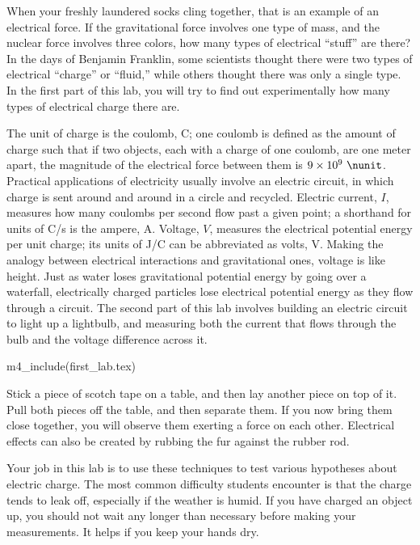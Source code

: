 \vfill

When your freshly laundered socks cling together, that is an
example of an electrical force. If the gravitational force
involves one type of mass, and the nuclear force involves
three colors, how many types of electrical ``stuff'' are
there? In the days of Benjamin Franklin, some scientists
thought there were two types of electrical ``charge'' or
``fluid,'' while others thought there was only a single
type. In the first part of this lab, you will try to find out experimentally
how many types of electrical charge there are.

\vfill

\enlargethispage{-1\baselineskip}

The unit of charge is the coulomb, C; one coulomb is defined as the
amount of charge such that if two objects, each with a charge of
one coulomb, are one meter apart, the magnitude of the electrical
force between them is $9\times10^9\ \nunit$.
Practical applications of electricity usually involve an electric
circuit, in which charge is sent around and around in a circle and
recycled. Electric current, $I$, measures how many coulombs per second flow
past a given point; a shorthand for units of C/s is the ampere, A.
Voltage, $V$, measures the electrical potential energy per unit charge;
its units of J/C can be abbreviated as volts, V. Making the analogy between
electrical interactions and gravitational ones, voltage is like height.
Just as water loses gravitational potential energy by going over a waterfall,
electrically charged particles lose electrical potential energy as they flow
through a circuit. The second part of this lab involves building an
electric circuit to light up a lightbulb, and measuring both the current that
flows through the bulb and the voltage difference across it.

\observations

m4_include(first_lab.tex)


Stick a piece of scotch tape on a table, and then lay
another piece on top of it. Pull both pieces off the table,
and then separate them. If you now bring them close
together, you will observe them exerting a force on each
other. Electrical effects can also be created by rubbing the
fur against the rubber rod.

Your job in this lab is to use these techniques to test
various hypotheses about electric charge. The most common
difficulty students encounter is that the charge tends to
leak off, especially if the weather is humid. If you have
charged an object up, you should not wait any longer than
necessary before making your measurements. It helps if you
keep your hands dry.

